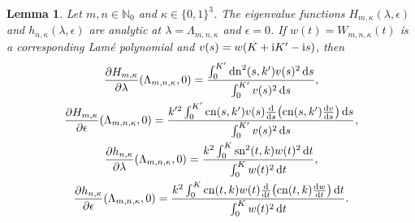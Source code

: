 \documentclass[pdftex]{sigma}
\newtheorem{Lemma}[thm]{Lemma}
\newcommand{\N}{\mathbb{N}}
\DeclareMathOperator{\sn}{sn}
\DeclareMathOperator{\cn}{cn}
\DeclareMathOperator{\dn}{dn}
\numberwithin{equation}{section}
\begin{document}
\begin{Lemma}\label{derivatives1}
Let $m,n\in\N_0$ and $\kappa\in\{0,1\}^3$. The eigenvalue functions $H_{m,\kappa}(\lambda,\epsilon)$ and $h_{n,\kappa}(\lambda,\epsilon)$
are analytic at $\lambda=\Lambda_{m,n,\kappa}$ and $\epsilon=0$.
If $w(t)=W_{m,n,\kappa}(t)$ is a corresponding Lam\'e polynomial and $v(s)=w(K+{\rm i}K'-{\rm i}s)$, then
\begin{gather}
 \frac{\partial H_{m,\kappa}}{\partial \lambda}(\Lambda_{m,n,\kappa},0) =
\frac{\int_0^{K'} \dn^2(s,k')v(s)^2\,{\rm d}s}{\int_0^{K'}v(s)^2\,{\rm d}s}, \label{deriv1}\\
\frac{\partial H_{m,\kappa}}{\partial \epsilon}(\Lambda_{m,n,\kappa},0) =
\frac{k'^2\int_0^{K'} \cn(s,k') v(s)\frac{{\rm d}}{{\rm d}s}\bigl(\cn(s,k')\frac{{\rm d}v}{{\rm d}s}\bigr)\,{\rm d}s}{\int_0^{K'} v(s)^2\,{\rm d}s},\label{deriv2}\\
 \frac{\partial h_{n,\kappa}}{\partial \lambda}(\Lambda_{m,n,\kappa},0) =
\frac{k^2\int_0^K \sn^2(t,k)w(t)^2\,{\rm d}t}{\int_0^K w(t)^2\,{\rm d}t},\label{deriv3}\\
\frac{\partial h_{n,\kappa}}{\partial \epsilon}(\Lambda_{m,n,\kappa},0) =
\frac{k^2\int_0^K \cn(t,k) w(t)\frac{{\rm d}}{{\rm d}t}\bigl(\cn(t,k)\frac{{\rm d}w}{{\rm d}t}\bigr)\,{\rm d}t}{\int_0^K w(t)^2\,{\rm d}t}.\label{deriv4}
\end{gather}
\end{Lemma}
\end{document}

